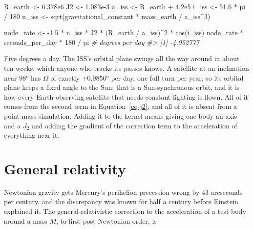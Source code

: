 \documentclass[
  10.5pt,
  letterpaper,
]{scrbook}
\newenvironment{Shaded}{\begin{snugshade}}{\end{snugshade}}
\newcommand{\CommentTok}[1]{\textcolor[rgb]{0.00,0.00,0.00}{\textit{#1}}}
\newcommand{\DecValTok}[1]{\textcolor[rgb]{0.00,0.00,0.00}{#1}}
\newcommand{\FloatTok}[1]{\textcolor[rgb]{0.00,0.00,0.00}{#1}}
\newcommand{\FunctionTok}[1]{\textcolor[rgb]{0.00,0.00,0.00}{#1}}
\newcommand{\NormalTok}[1]{\textcolor[rgb]{0.00,0.00,0.00}{#1}}
\newcommand{\OtherTok}[1]{\textcolor[rgb]{0.00,0.00,0.00}{#1}}
\newcommand{\SpecialCharTok}[1]{\textcolor[rgb]{0.00,0.00,0.00}{#1}}
\theoremstyle{definition}
\theoremstyle{plain}
\theoremstyle{remark}
\begin{document}
\begin{Shaded}
\begin{Highlighting}[]
\NormalTok{R\_earth }\OtherTok{\textless{}{-}} \FloatTok{6.378e6}
\NormalTok{J2      }\OtherTok{\textless{}{-}} \FloatTok{1.083e{-}3}
\NormalTok{a\_iss   }\OtherTok{\textless{}{-}}\NormalTok{ R\_earth }\SpecialCharTok{+} \FloatTok{4.2e5}
\NormalTok{i\_iss   }\OtherTok{\textless{}{-}} \FloatTok{51.6} \SpecialCharTok{*}\NormalTok{ pi }\SpecialCharTok{/} \DecValTok{180}
\NormalTok{n\_iss   }\OtherTok{\textless{}{-}} \FunctionTok{sqrt}\NormalTok{(gravitational\_constant }\SpecialCharTok{*}\NormalTok{ mass\_earth }\SpecialCharTok{/}\NormalTok{ a\_iss}\SpecialCharTok{\^{}}\DecValTok{3}\NormalTok{)}

\NormalTok{node\_rate }\OtherTok{\textless{}{-}} \SpecialCharTok{{-}}\FloatTok{1.5} \SpecialCharTok{*}\NormalTok{ n\_iss }\SpecialCharTok{*}\NormalTok{ J2 }\SpecialCharTok{*}\NormalTok{ (R\_earth }\SpecialCharTok{/}\NormalTok{ a\_iss)}\SpecialCharTok{\^{}}\DecValTok{2} \SpecialCharTok{*} \FunctionTok{cos}\NormalTok{(i\_iss)}
\NormalTok{node\_rate }\SpecialCharTok{*}\NormalTok{ seconds\_per\_day }\SpecialCharTok{*} \DecValTok{180} \SpecialCharTok{/}\NormalTok{ pi        }\CommentTok{\# degrees per day}
\CommentTok{\#\textgreater{} [1] {-}4.952777}
\end{Highlighting}
\end{Shaded}

Five degrees a day. The ISS's orbital plane swings all the way around in
about ten weeks, which anyone who tracks its passes knows. A satellite
at an inclination near \(98°\) has \(\dot\Omega\) of exactly
\(+0.9856°\) per day, one full turn per year, so its orbital plane keeps
a fixed angle to the Sun: that is a Sun-synchronous orbit, and it is how
every Earth-observing satellite that needs constant lighting is flown.
All of it comes from the second term in Equation~\ref{eq-j2}, and all of
it is absent from a point-mass simulation. Adding it to the kernel means
giving one body an axis and a \(J_2\) and adding the gradient of the
correction term to the acceleration of everything near it.

\section{General relativity}\label{general-relativity}

Newtonian gravity gets Mercury's perihelion precession wrong by 43
arcseconds per century, and the discrepancy was known for half a century
before Einstein explained it. The general-relativistic correction to the
acceleration of a test body around a mass \(M\), to first post-Newtonian
order, is
\end{document}
